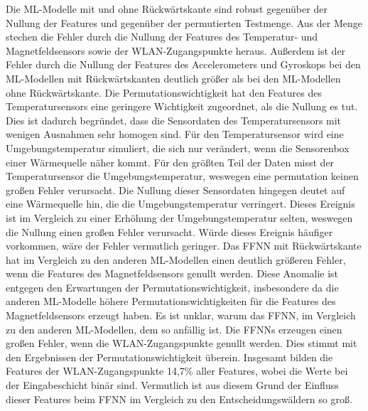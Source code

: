 \newline
\newline
Die ML-Modelle mit und ohne Rückwärtskante sind robust gegenüber der Nullung der Features und gegenüber der permutierten Testmenge.
Aus der Menge stechen die Fehler durch die Nullung der Features des Temperatur- und Magnetfeldsensors sowie der WLAN-Zugangspunkte heraus.
Außerdem ist der Fehler durch die Nullung der Features des Accelerometers und Gyroskops bei den ML-Modellen mit Rückwärtskanten
deutlich größer als bei den ML-Modellen ohne Rückwärtskante.
\newline
\newline
Die Permutationswichtigkeit hat den Features des Temperatursensors eine geringere Wichtigkeit zugeordnet, als die Nullung es tut.
Dies ist dadurch begründet, dass die Sensordaten des Temperatursensors mit wenigen Ausnahmen sehr homogen sind.
Für den Temperatursensor wird eine Umgebungstemperatur simuliert, die sich nur verändert, wenn die Sensorenbox einer Wärmequelle näher kommt.
Für den größten Teil der Daten misst der Temperatursensor die Umgebungstemperatur, weswegen eine permutation keinen großen Fehler verursacht.
Die Nullung dieser Sensordaten hingegen deutet auf eine Wärmequelle hin, die die Umgebungstemperatur verringert.
Dieses Ereignis ist im Vergleich zu einer Erhöhung der Umgebungstemperatur selten, weswegen die Nullung einen großen Fehler verursacht.
Würde dieses Ereignis häufiger vorkommen, wäre der Fehler vermutlich geringer.
\newline
\newline
Das FFNN mit Rückwärtskante hat im Vergleich zu den anderen ML-Modellen einen deutlich größeren Fehler, wenn die Features des Magnetfeldsensors genullt werden.
Diese Anomalie ist entgegen den Erwartungen der Permutationswichtigkeit, insbesondere da die anderen ML-Modelle
höhere Permutationswichtigkeiten für die Features des Magnetfeldsensors erzeugt haben.
Es ist unklar, warum das FFNN, im Vergleich zu den anderen ML-Modellen, dem so anfällig ist.
\newline
\newline
Die FFNNs erzeugen einen großen Fehler, wenn die WLAN-Zugangspunkte genullt werden.
Dies stimmt mit den Ergebnissen der Permutationswichtigkeit überein.
Insgesamt bilden die Features der WLAN-Zugangspunkte 14,7\% aller Features, wobei die Werte bei der Eingabeschicht binär sind.
Vermutlich ist aus diesem Grund der Einfluss dieser Features beim FFNN im Vergleich zu den Entscheidungswäldern so groß.
\newline
